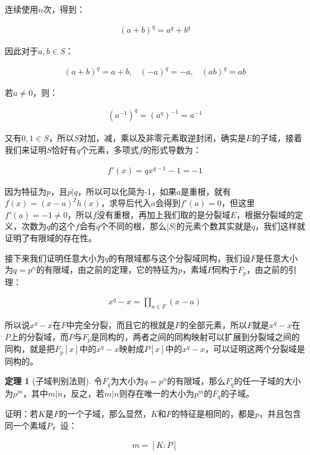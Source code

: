 \documentclass[12pt, a4paper, oneside]{ctexart}
\theoremstyle{definition}
\newtheorem*{theorem}{定理}
\begin{document}
连续使用$n$次，得到：

\begin{align*}
(a+b)^q=a^q+b^q
\end{align*}

因此对于$a,b\in S$：

\begin{align*}
(a+b)^q=a+b,\;\;\;(-a)^q=-a,\;\;\; (ab)^q=ab
\end{align*}

若$a\neq 0$，则：

\begin{align*}
(a^{-1})^q=(a^q)^{-1}=a^{-1}
\end{align*}

又有$0,1\in S$，所以$S$对加，减，乘以及非零元素取逆封闭，确实是$E$的子域，接着我们来证明$S$恰好有$q$个元素，多项式$f$的形式导数为：

\begin{align*}
f'(x)=qx^{q-1}-1=-1
\end{align*}

因为特征为$p$，且$p|q$，所以可以化简为-1，如果$a$是重根，就有$f(x)=(x-a)^2h(x)$，求导后代入$a$会得到$f'(a)=0$，但这里$f'(a)=-1\neq 0$，所以$f$没有重根，再加上我们取的是分裂域$E$，根据分裂域的定义，次数为$q$的这个$f$会有$q$个不同的根，那么$|S|$的元素个数其实就是$q$，我们这样就证明了有限域的存在性。

接下来我们证明任意大小为$q$的有限域都与这个分裂域同构，我们设$F$是任意大小为$q=p^n$的有限域，由之前的定理，它的特征为$p$，素域$P$同构于$F_p$，由之前的引理：

\begin{align*}
x^q-x=\prod_{a\in F}(x-a)
\end{align*}

所以说$x^q-x$在$F$中完全分裂，而且它的根就是$F$的全部元素，所以$F$就是$x^q-x$在$P$上的分裂域，而$P$与$F_p$是同构的，两者之间的同构映射可以扩展到分裂域之间的同构，就是把$F_p[x]$中的$x^q-x$映射成$P[x]$中的$x^q-x$，可以证明这两个分裂域是同构的。

\begin{theorem}[子域判别法则]
令$F_q$为大小为$q=p^n$的有限域，那么$F_q$的任一子域的大小为$p^m$，其中$m|n$，反之，若$m|n$则存在唯一的大小为$p^m$的$F_q$的子域。
\end{theorem}

证明：若$K$是$F$的一个子域，那么显然，$K$和$F$的特征是相同的，都是$p$，并且包含同一个素域$P$，设：

\begin{align*}
m=[K:P]
\end{align*}
\end{document}
